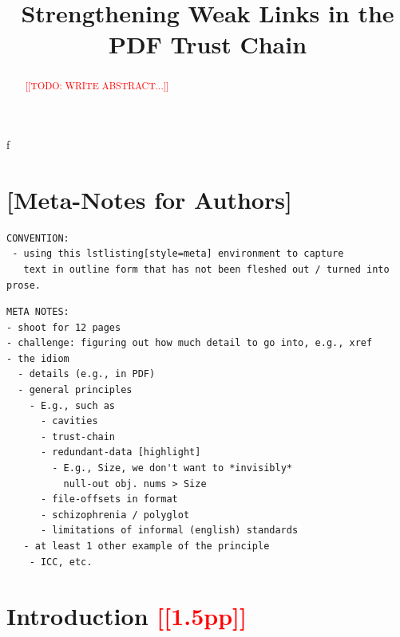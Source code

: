 \documentclass[conference,12pt]{IEEEtran}
\newcommand{\note}[1]{\noteYes{#1}}
\newcommand{\noteYes}[1]{\textcolor{red}{[[#1]]}}
\newcommand{\todo}[1]{\note{TODO: #1}}
\begin{document}
\date{}

\title{Strengthening Weak Links in the PDF Trust Chain}

\author{
     \and
}

\maketitle

f\begin{abstract}

\todo{WRITE ABSTRACT...}
  
\end{abstract}

\section{[Meta-Notes for Authors]}

\begin{lstlisting}[style=meta]
CONVENTION:
 - using this lstlisting[style=meta] environment to capture
   text in outline form that has not been fleshed out / turned into prose.
\end{lstlisting}

\begin{lstlisting}[style=meta]
META NOTES:  
- shoot for 12 pages
- challenge: figuring out how much detail to go into, e.g., xref
- the idiom
  - details (e.g., in PDF)
  - general principles
    - E.g., such as
      - cavities
      - trust-chain 
      - redundant-data [highlight]
        - E.g., Size, we don't want to *invisibly*
          null-out obj. nums > Size
      - file-offsets in format
      - schizophrenia / polyglot
      - limitations of informal (english) standards
   - at least 1 other example of the principle
    - ICC, etc.
\end{lstlisting}

\section{Introduction \note{1.5pp}}
\label{sec:intro}
\end{document}
